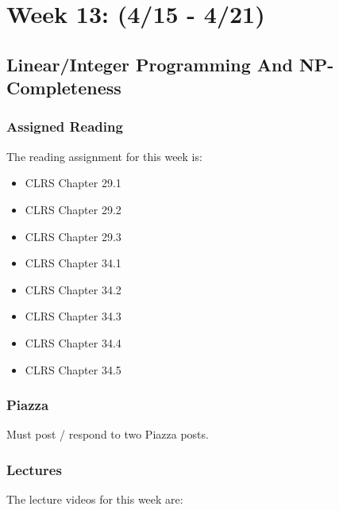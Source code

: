 \clearpage

\renewcommand{\ChapTitle}{Week 13: (4/15 - 4/21)}
\renewcommand{\SectionTitle}{Linear/Integer Programming And NP-Completeness}

\chapter{\ChapTitle}

\section{\SectionTitle}

\subsection{Assigned Reading}

The reading assignment for this week is:

\begin{itemize}
    \item CLRS Chapter 29.1
    \item CLRS Chapter 29.2
    \item CLRS Chapter 29.3
    \item CLRS Chapter 34.1
    \item CLRS Chapter 34.2
    \item CLRS Chapter 34.3
    \item CLRS Chapter 34.4
    \item CLRS Chapter 34.5
\end{itemize}

\subsection{Piazza}

Must post / respond to two Piazza posts. 

\subsection{Lectures}

The lecture videos for this week are:

